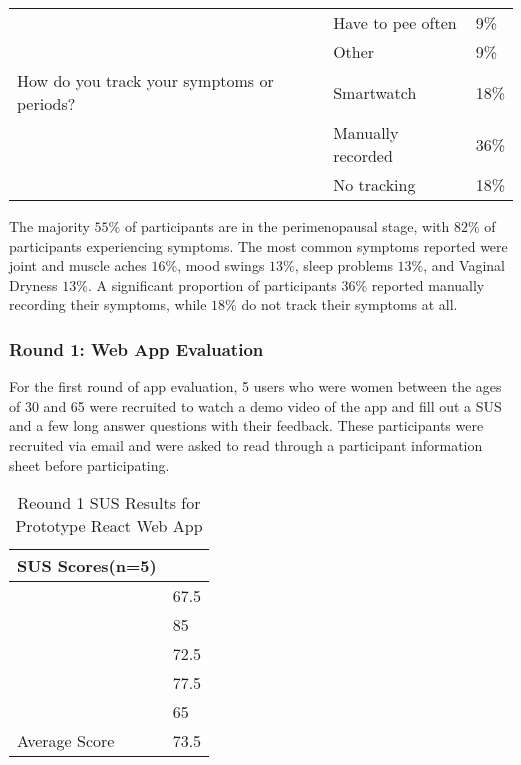 \begin{table}[h!!]
{\begin{tabular}{lll}
                                                                                        & Have to pee often      & 9\%  \\
                                                                                        & Other                  & 9\%  \\
        How do you track your symptoms or periods?                                      & Smartwatch             & 18\% \\
                                                                                        & Manually recorded      & 36\% \\
                                                                                        & No tracking            & 18\% \\ \hline
        \end{tabular}
    }
  \end{table}

The majority \(55\%\) of participants are in the perimenopausal stage, with \(82\%\) of participants experiencing symptoms. The most common symptoms reported were joint and muscle aches \(16\%\), mood swings \(13\%\), sleep problems \(13\%\), and Vaginal Dryness \(13\%\). A significant proportion of participants \(36\%\) reported manually recording their symptoms, while \(18\%\) do not track their symptoms at all. 

\subsubsection{Round 1: Web App Evaluation}
For the first round of app evaluation, 5 users who were women between the ages of 30 and 65 were recruited to watch a demo video of the app and fill out a SUS and a few long answer questions with their feedback. These participants were recruited via email and were asked to read through a participant information sheet before participating. 

\begin{table}[h!!]
    \caption{Reound 1 SUS Results for Prototype React Web App}
    \label{table:proto-sus}
    \begin{tabular}{ll}
    \hline
    SUS Scores(n=5) &      \\ \hline
                    & 67.5 \\
                    & 85   \\
                    & 72.5 \\
                    & 77.5 \\
                    & 65   \\
        Average Score & 73.5
    \end{tabular}
    \end{table}

